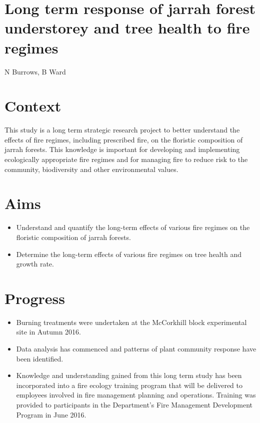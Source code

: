 \documentclass[version=last,
    paper=a4, %
    10pt, %
    usenames,
    dvipsnames,
    oneside, %
    headings=openany, %
    DIV=15 %
]{scrbook}
\begin{document}
\section*{Long term response of jarrah forest understorey and tree health to fire
regimes
}

N Burrows, B Ward


\section*{Context}
This study is a long term strategic research project to better
understand the effects of fire regimes, including prescribed fire, on
the floristic composition of jarrah forests. This knowledge is important
for developing and implementing ecologically appropriate fire regimes
and for managing fire to reduce risk to the community, biodiversity and
other environmental values.



\section*{Aims}
\begin{itemize}
\itemsep1pt\parskip0pt
\item
  Understand and quantify the long-term effects of various fire regimes
  on the floristic composition of jarrah forests.
\item
  Determine the long-term effects of various fire regimes on tree health
  and growth rate.
\end{itemize}



\section*{Progress}
\begin{itemize}
\itemsep1pt\parskip0pt
\item
  Burning treatments were undertaken at the McCorkhill block
  experimental site in Autumn 2016.
\item
  Data analysis has commenced and patterns of plant community response
  have been identified.
\item
  Knowledge and understanding gained from this long term study has been
  incorporated into a fire ecology training program that will be
  delivered to employees involved in fire management planning and
  operations. Training was provided to participants in the Department's
  Fire Management Development Program in June 2016.
\end{itemize}
\end{document}
